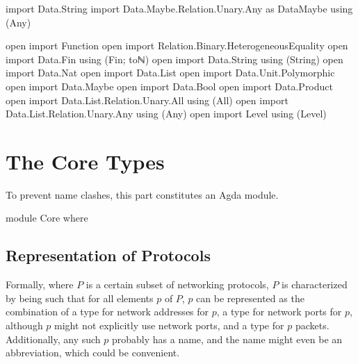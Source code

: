 \documentclass{report}
\begin{document}
\begin{code}
import Data.String
import Data.Maybe.Relation.Unary.Any as DataMaybe using (Any)

open import Function
open import Relation.Binary.HeterogeneousEquality
open import Data.Fin using (Fin; toℕ)
open import Data.String using (String)
open import Data.Nat
open import Data.List
open import Data.Unit.Polymorphic
open import Data.Maybe
open import Data.Bool
open import Data.Product
open import Data.List.Relation.Unary.All using (All)
open import Data.List.Relation.Unary.Any using (Any)
open import Level using (Level)
\end{code}

\part{The Core Types}
To prevent name clashes, this part constitutes an Agda module.

\begin{code}
module Core where
\end{code}

\chapter{Representation of Protocols}
Formally, where \(P\) is a certain subset of networking protocols, \(P\) is characterized by being such that for all elements \(p\) of \(P\), \(p\) can be represented as the combination of a type for network addresses for \(p\), a type for network ports for \(p\), although \(p\) might not explicitly use network ports, and a type for \(p\) packets.  Additionally, any such \(p\) probably has a name, and the name might even be an abbreviation, which could be convenient.
\end{document}
